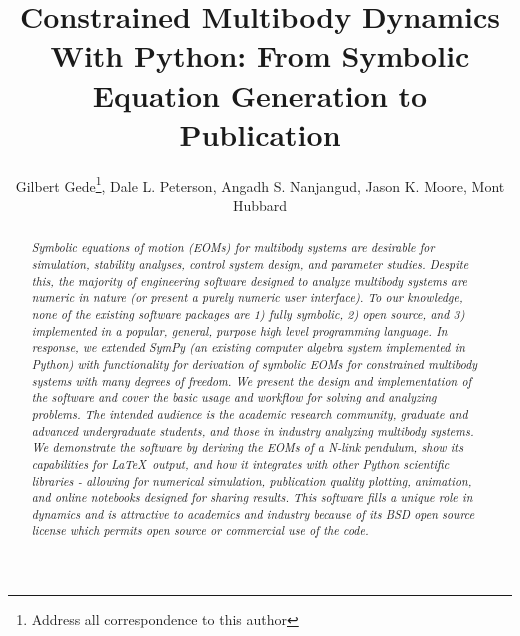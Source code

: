 \documentclass[twocolumn,10pt,final]{asme2e}
\title{Constrained Multibody Dynamics With Python: From Symbolic
Equation Generation to Publication}
\author{Gilbert Gede\thanks{Address all correspondence to this author}, Dale L.
Peterson, Angadh S. Nanjangud, Jason K. Moore, Mont Hubbard
  \affiliation{
    Sports Biomechanics Laboratory\\
    Department of Mechanical and Aerospace Engineering\\
    University of California\\
    Davis, California 95616\\
    Email: \{ggede, dlpeterson, asnanjangud, jkmoor, mhubbard\}@ucdavis.edu
  }
}
\begin{document}
\maketitle

\begin{abstract}
\it Symbolic equations of motion (EOMs) for multibody systems are desirable
for simulation, stability analyses, control system design, and parameter
studies.
Despite this, the majority of engineering software designed to analyze
multibody systems are numeric in nature (or present a purely numeric user
interface). To our knowledge, none of the existing software packages are 1)
fully symbolic, 2) open source, and 3) implemented in a popular, general,
purpose high level programming language.
In response, we extended SymPy (an existing computer algebra system implemented
in Python) with functionality for derivation of symbolic EOMs for constrained
multibody systems with many degrees of freedom.
We present the design and implementation of the software and cover the basic
usage and workflow for solving and analyzing problems. The intended audience is
the academic research community, graduate and advanced undergraduate students,
and those in industry analyzing multibody systems.
We demonstrate the software by deriving the EOMs of a N-link pendulum, show its
capabilities for \LaTeX\ output, and how it integrates with other Python
scientific libraries - allowing for numerical simulation, publication quality
plotting, animation, and online notebooks designed for sharing results.
This software fills a unique role in dynamics and is attractive to academics
and industry because of its BSD open source license which permits open source
or commercial use of the code.

\end{abstract}

\end{document}
